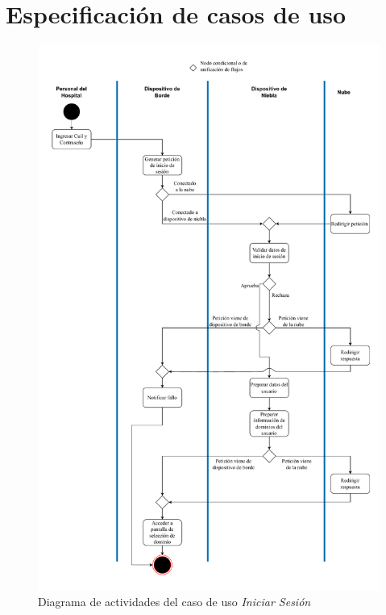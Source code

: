 \chapter{Especificación de casos de uso}
\label{Anexo: Especificacion}
\begin{figure}
    \centering
    \includegraphics[height=\textheight, keepaspectratio]{Imagenes/Implementacion/IniciarSesionDA.pdf}
    \caption{Diagrama de actividades del caso de uso \textit{Iniciar Sesión}}
    \label{fig:diagActIniciarSesion}
\end{figure}




